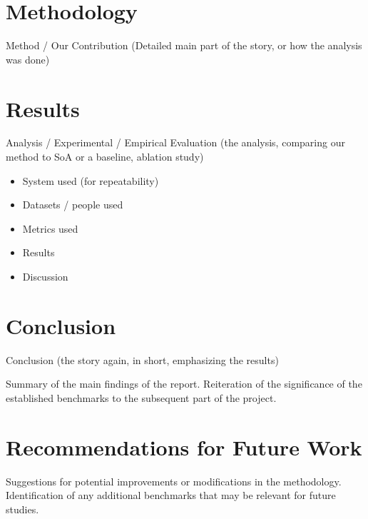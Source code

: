 \section{Methodology}
Method / Our Contribution (Detailed main part of the story, or how the analysis was done)

\section{Results}
Analysis / Experimental / Empirical Evaluation (the analysis, comparing our method to SoA or a baseline, ablation study)
\begin{itemize}
    \item System used (for repeatability)
    \item Datasets / people used
    \item Metrics used
    \item Results
    \item Discussion
\end{itemize}

\section{Conclusion}
Conclusion (the story again, in short, emphasizing the results)

Summary of the main findings of the report.
Reiteration of the significance of the established benchmarks to the subsequent part of the project.

\section{Recommendations for Future Work}
Suggestions for potential improvements or modifications in the methodology.
Identification of any additional benchmarks that may be relevant for future studies.
